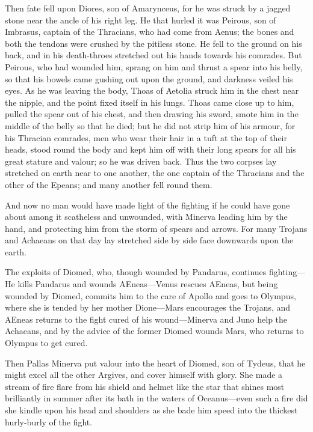 Then fate fell upon Diores, son of Amarynceus, for he was struck by a
jagged stone near the ancle of his right leg. He that hurled it was
Peirous, son of Imbrasus, captain of the Thracians, who had come from
Aenus; the bones and both the tendons were crushed by the pitiless stone.
He fell to the ground on his back, and in his death-throes stretched out
his hands towards his comrades. But Peirous, who had wounded him, sprang
on him and thrust a spear into his belly, so that his bowels came gushing
out upon the ground, and darkness veiled his eyes. As he was leaving the
body, Thoas of Aetolia struck him in the chest near the nipple, and the
point fixed itself in his lungs. Thoas came close up to him, pulled the
spear out of his chest, and then drawing his sword, smote him in the
middle of the belly so that he died; but he did not strip him of his
armour, for his Thracian comrades, men who wear their hair in a tuft at
the top of their heads, stood round the body and kept him off with their
long spears for all his great stature and valour; so he was driven back.
Thus the two corpses lay stretched on earth near to one another, the one
captain of the Thracians and the other of the Epeans; and many another
fell round them.

And now no man would have made light of the fighting if he could have gone
about among it scatheless and unwounded, with Minerva leading him by the
hand, and protecting him from the storm of spears and arrows. For many
Trojans and Achaeans on that day lay stretched side by side face downwards
upon the earth.


The exploits of Diomed, who, though wounded by Pandarus, continues
fighting—He kills Pandarus and wounds AEneas—Venus rescues
AEneas, but being wounded by Diomed, commits him to the care of Apollo and
goes to Olympus, where she is tended by her mother Dione—Mars
encourages the Trojans, and AEneas returns to the fight cured of his wound—Minerva
and Juno help the Achaeans, and by the advice of the former Diomed wounds
Mars, who returns to Olympus to get cured.

Then Pallas Minerva put valour into the heart of Diomed, son of Tydeus,
that he might excel all the other Argives, and cover himself with glory.
She made a stream of fire flare from his shield and helmet like the star
that shines most brilliantly in summer after its bath in the waters of
Oceanus—even such a fire did she kindle upon his head and shoulders
as she bade him speed into the thickest hurly-burly of the fight.

